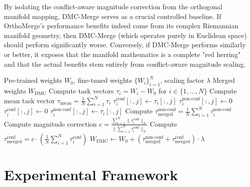 \documentclass{article}
\begin{document}
By isolating the conflict-aware magnitude correction from the orthogonal manifold mapping, DMC-Merge serves as a crucial controlled baseline. If OrthoMerge's performance benefits indeed come from its complex Riemannian manifold geometry, then DMC-Merge (which operates purely in Euclidean space) should perform significantly worse. Conversely, if DMC-Merge performs similarly or better, it exposes that the manifold mathematics is a complete "red herring" and that the actual benefits stem entirely from conflict-aware magnitude scaling.

\begin{algorithm}[tb]
\caption{Decoupled Magnitude-Corrected (DMC) Merging}
\label{alg:dmc}
\begin{algorithmic}[1]
 Pre-trained weights $W_0$, fine-tuned weights $\{W_i\}_{i=1}^N$, scaling factor $\lambda$
 Merged weights $W_{\text{DMC}}$
\STATE Compute task vectors $\tau_i = W_i - W_0$ for $i \in \{1,\dots,N\}$
\STATE Compute mean task vector $\tau_{\text{mean}} = \frac{1}{N}\sum_{i=1}^N \tau_i$
            \STATE $\tau_i^{\text{conf}}[:, j] \leftarrow \tau_i[:, j]$
            \STATE $\tau_i^{\text{non-conf}}[:, j] \leftarrow 0$
        \ELSE
            \STATE $\tau_i^{\text{conf}}[:, j] \leftarrow 0$
            \STATE $\tau_i^{\text{non-conf}}[:, j] \leftarrow \tau_i[:, j]$
        \ENDIF
    \ENDFOR
\ENDFOR
\STATE Compute $\tau_{\text{merged}}^{\text{non-conf}} = \frac{1}{N} \sum_{i=1}^N \tau_i^{\text{non-conf}}$
\STATE Compute magnitude correction $c = \frac{\sum_{i=1}^N \|\tau_i^{\text{conf}}\|_F}{\|\sum_{i=1}^N \tau_i^{\text{conf}}\|_F}$
\STATE Compute $\tau_{\text{merged}}^{\text{conf}} = c \cdot \left(\frac{1}{N} \sum_{i=1}^N \tau_i^{\text{conf}}\right)$
\STATE $W_{\text{DMC}} \leftarrow W_0 + \left(\tau_{\text{merged}}^{\text{non-conf}} + \tau_{\text{merged}}^{\text{conf}}\right) \cdot \lambda$
\end{algorithmic}
\end{algorithm}

\section{Experimental Framework}
\label{experimental_framework}
\end{document}
